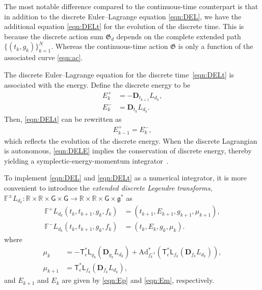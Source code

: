 \documentclass[letterpaper, 10pt, conference]{ieeeconf}
\newcommand{\G}{\ensuremath{\mathsf{G}}}
\newcommand{\T}{\ensuremath{\mathsf{T}}}
\renewcommand{\L}{\ensuremath{\mathsf{L}}}
\renewcommand{\Re}{\ensuremath{\mathbb{R}}}
\newcommand{\D}{\ensuremath{\mathbf{D}}}
\newcommand{\Ad}{\ensuremath{\mathrm{Ad}}}
\newcommand{\g}{\ensuremath{\mathfrak{g}}}
\begin{document}
The most notable difference compared to the continuous-time counterpart is that in addition to the discrete Euler--Lagrange equation \eqref{eqn:DEL}, we have the additional equation \eqref{eqn:DELt} for the evolution of the discrete time. 
This is because the discrete action sum $\mathfrak{G}_d$ depends on the complete extended path $\{(t_k,g_k)\}_{k=1}^N$.
Whereas the continuous-time action $\mathfrak{G}$ is only a function of the associated curve \eqref{eqn:ac}.

The discrete Euler--Lagrange equation for the discrete time~\eqref{eqn:DELt} is associated with the energy.
Define the discrete energy to be
\begin{align}
    E^+_k &= - \D_{t_{k+1}} L_{d_k},\label{eqn:Ep}\\
    E^-_k &= \D_{t_{k}} L_{d_k}.\label{eqn:Em}
\end{align}
Then, \eqref{eqn:DELt} can be rewritten as
\begin{align}
    E^+_{k-1} = E^-_k,\label{eqn:DELE}
\end{align}
which reflects the evolution of the discrete energy. 
When the discrete Lagrangian is autonomous, \eqref{eqn:DELE} implies the conservation of discrete energy, thereby yielding a symplectic-energy-momentum integrator~\cite{KaMaOr1999}.




To implement \eqref{eqn:DEL} and \eqref{eqn:DELt} as a numerical integrator, it is more convenient to introduce the \textit{extended discrete Legendre transforms}, $\mathbb{F}^\pm L_{d_k}: \Re\times\Re \times \G \times \G \rightarrow \Re\times \Re\times\G\times\g^*$ as
\begin{align}
    \mathbb{F}^+ L_{d_k} (t_k,t_{k+1}, g_k,f_k) & = (t_{k+1}, E_{k+1}, g_{k+1}, \mu_{k+1}),\\
    \mathbb{F}^- L_{d_k} (t_k,t_{k+1}, g_k,f_k) & = (t_k, E_k, g_{k}, \mu_{k}).
\end{align}
where
\begin{align}
    \mu_k & = -\T^*_e\L_{g_k}(\D_{g_k} L_{d_k})+ \Ad^*_{f_k^{-1}} (\T^*_e\L_{f_k}(\D_{f_k} L_{d_k})),\label{eqn:muk}\\
    \mu_{k+1} & = \T^*_e\L_{f_k} (\D_{f_k} L_{d_k}),\label{eqn:mukp}
\end{align}
and $E_{k+1}$ and $E_k$ are given by \eqref{eqn:Ep} and \eqref{eqn:Em}, respectively. 
\end{document}
